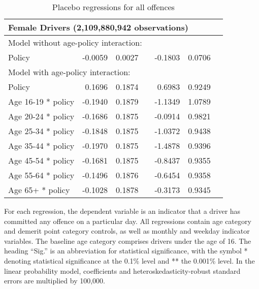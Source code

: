 \begin{table}
\begin{tabular}{l r r l r r l}
\hline 

\multicolumn{7}{l}{\textbf{Female Drivers} (2,109,880,942  observations)} \\ 

\hline
\multicolumn{7}{l}{Model without age-policy interaction: } \\ 
Policy                   &  -0.0059        &  0.0027       &            &  -0.1803        &  0.0706       &            \\ 
\hline
\multicolumn{7}{l}{Model with age-policy interaction: } \\ 
Policy                   &  0.1696        &  0.1874       &            &  0.6983        &  0.9249       &            \\ 
Age 16-19 * policy   &  -0.1940        &  0.1879       &            &  -1.1349        &  1.0789       &            \\ 
Age 20-24 * policy   &  -0.1686        &  0.1875       &            &  -0.0914        &  0.9821       &            \\ 
Age 25-34 * policy   &  -0.1848        &  0.1875       &            &  -1.0372        &  0.9438       &            \\ 
Age 35-44 * policy   &  -0.1970        &  0.1875       &            &  -1.4878        &  0.9396       &            \\ 
Age 45-54 * policy   &  -0.1681        &  0.1875       &            &  -0.8437        &  0.9355       &            \\ 
Age 55-64 * policy   &  -0.1496        &  0.1876       &            &  -0.6454        &  0.9358       &            \\ 
Age 65+ * policy   &  -0.1028        &  0.1878       &            &  -0.3173        &  0.9345       &            \\ 

\hline 

\end{tabular} 
\caption{Placebo regressions for all offences} 
For each regression, the dependent variable is an indicator that a driver has committed  
any offence on a particular day.  
All regressions contain age category and demerit point category controls, 
as well as monthly and weekday indicator variables. 
The baseline age category comprises drivers under the age of 16. 
The heading ``Sig.'' is an abbreviation for statistical significance, with 
the symbol * denoting statistical significance at the 0.1\% level 
and ** the 0.001\% level. 
In the linear probability model, coefficients and heteroskedasticity-robust standard errors are  
multiplied by 100,000.  
\label{tab:seas_Logit_vs_LPMx100K_placebo_regs} 
\end{table} 
 
